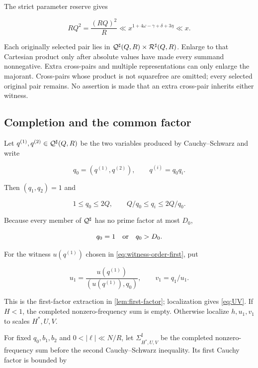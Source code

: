 The strict parameter reserve gives

\begin{equation}\label{eq:RQ2}
 RQ^2=\frac{(RQ)^2}{R}
 \ll x^{1+4\omega-\gamma+\delta+3\eta}\ll x.
\end{equation}

Each originally selected pair lies in
$\mathcal Q^{\sharp}(Q,R)\times\mathcal R^{\sharp}(Q,R)$.  Enlarge to that Cartesian product only after
absolute values have made every summand nonnegative.  Extra cross-pairs and
multiple representations can only enlarge the majorant.  Cross-pairs whose
product is not squarefree are omitted; every selected original pair remains.
No assertion is made that an extra cross-pair inherits either witness.

\subsection{Completion and the common factor}

Let $q^{(1)},q^{(2)}\in\mathcal Q^{\sharp}(Q,R)$ be the two variables produced by
Cauchy--Schwarz and write

\begin{equation}\label{eq:q0-decomposition}
 q_0=(q^{(1)},q^{(2)}),\qquad q^{(i)}=q_0q_i.
\end{equation}

Then $(q_1,q_2)=1$ and

\begin{equation}\label{eq:q0-range}
 1\le q_0\le2Q,\qquad Q/q_0\le q_i\le2Q/q_0.
\end{equation}

Because every member of $\mathcal Q^{\sharp}$ has no prime factor at most $D_0$,

\begin{equation}\label{eq:q0-dichotomy}
 q_0=1\quad\hbox{or}\quad q_0>D_0.
\end{equation}

For the witness $u(q^{(1)})$ chosen in
\cref{eq:witness-order-first}, put

\begin{equation}\label{eq:outer-u1v1}
 u_1=\frac{u(q^{(1)})}{(u(q^{(1)}),q_0)},
 \qquad v_1=q_1/u_1.
\end{equation}

This is the first-factor extraction in \cref{lem:first-factor}; localization
gives \cref{eq:UV}.  If $H<1$, the completed nonzero-frequency sum is empty.
Otherwise localize $h,u_1,v_1$ to scales $H^*,U,V$.

For fixed $q_0,b_1,b_2$ and $0<|\ell|\ll N/R$, let
$\Sigma^\sharp_{H^*,U,V}$ be the completed nonzero-frequency sum before the
second Cauchy--Schwarz inequality.  Its first Cauchy factor is bounded by

